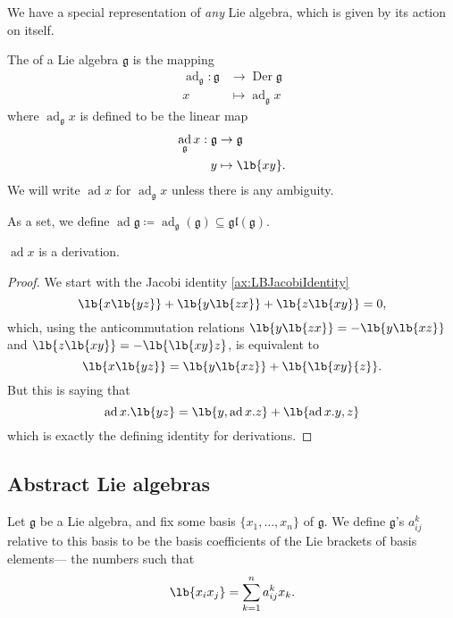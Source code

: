 \documentclass{article}
\DeclarePairedDelimiter\lb\lbrack\rbrack
\DeclareMathOperator{\Der}{Der}
\DeclareMathOperator{\ad}{ad}
\newcommand*\frkg{{\ensuremath{\mathfrak{g}}}}
\newcommand*\glalg{\ensuremath{\mathfrak{gl}}}
\newcommand*\acts{.}
\begin{document}
We have a special representation of \textit{any} Lie algebra, which is given by its action on itself.

\begin{definition}
    The  of a Lie algebra $\frkg$ is the mapping
    \begin{align*}
        \ad_\frkg:
        \frkg 
        &\to
        \Der \frkg
        \\
        x 
        &\mapsto 
        \ad_\frkg x
    \end{align*}
    where $\ad_\frkg x$ is defined to be the linear map
    \begin{align*}
        \ad_\frkg x: 
        \frkg 
        &\to 
        \frkg \\
        y 
        &\mapsto
        \lb{xy}.
    \end{align*}
    We will write $\ad x$ for $\ad_\frkg x$ unless there is any ambiguity.

    As a set, we define $\ad \frkg \coloneq \ad_\frkg(\frkg) \subseteq \glalg(\frkg)$.
\end{definition}

\begin{proposition}
    $\ad x$ is a derivation.
\end{proposition}
\begin{proof}
    We start with the Jacobi identity \ref{ax:LBJacobiIdentity}
    \[
        \lb{x\lb{yz}} + \lb{y\lb{zx}} + \lb{z\lb{xy}}
        =
        0,
    \]
    which, using the anticommutation relations $\lb{y\lb{zx}} = -\lb{y\lb{xz}}$ and $\lb{z\lb{xy}} = -\lb{\lb{xy}z}$, is equivalent to
    \[
        \lb{x\lb{yz}}
        =
        \lb{y\lb{xz}} + \lb{\lb{xy}{z}}.
    \]
    But this is saying that
    \[
        \ad x \acts \lb{yz}
        =
        \lb{y, \ad x \acts z}
        +
        \lb{\ad x \acts y, z}
    \]
    which is exactly the defining identity for derivations.
\end{proof}


\subsection{Abstract Lie algebras}

\begin{definition}
    Let $\frkg$ be a Lie algebra, and fix some basis $\{x_1,\ldots,x_n\}$ of $\frkg$.
    We define $\frkg$'s  $a^k_{ij}$ relative to this basis to be the basis coefficients of the Lie brackets of basis elements--- the numbers such that
    \[
        \lb{x_ix_j}
        =
        \sum_{k=1}^n
        a^k_{ij}
        x_k.
    \]
\end{definition}
\end{document}
